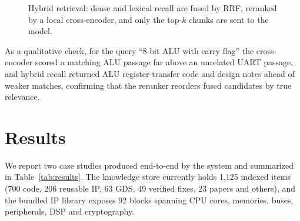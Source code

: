 \documentclass[conference]{IEEEtran}
\begin{document}
\begin{figure}[t]
\centering
{}
\caption{Hybrid retrieval: dense and lexical recall are fused by RRF, reranked by a local
cross-encoder, and only the top-$k$ chunks are sent to the model.}
\label{fig:rag}
\end{figure}

As a qualitative check, for the query ``8-bit ALU with carry flag'' the
cross-encoder scored a matching ALU passage far above an unrelated UART passage,
and hybrid recall returned ALU register-transfer code and design notes ahead of
weaker matches, confirming that the reranker reorders fused candidates by true
relevance.

\section{Results}
We report two case studies produced end-to-end by the system and summarized in
Table~\ref{tab:results}. The knowledge store currently holds 1{,}125 indexed
items (700 code, 206 reusable IP, 63 GDS, 49 verified fixes, 23 papers and
others), and the bundled IP library exposes 92 blocks spanning CPU cores,
memories, buses, peripherals, DSP and cryptography.
\end{document}
